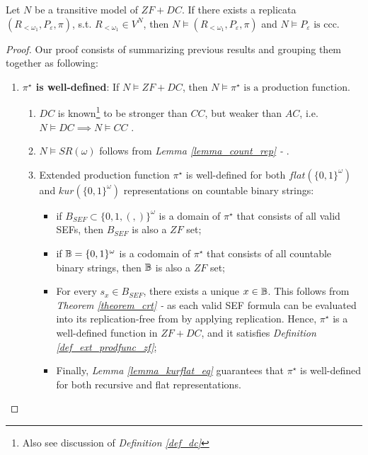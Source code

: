 \begin{lemma}\label{lemma_construct_replicata}
    Let $N$ be a transitive model of $ZF+DC$. If there exists a replicata $(R_{<\omega_1}, P_\varepsilon, \pi)$, s.t. $R_{<\omega_1} \in V^N$, then $N \models (R_{<\omega_1}, P_\varepsilon, \pi)$ and $N \models P_\varepsilon \text{ is ccc}$.
\end{lemma}
\begin{proof}
    Our proof consists of summarizing previous results and grouping them together as following: 
    \begin{enumerate}
        \item \textbf{$\pi^\star$ is well-defined}: If $N \models ZF + DC$, then $N \models \pi^\star \text{ is a production function}$.
        \begin{enumerate}[label=(\roman*)]
            \item $DC$ is known\footnote{Also see discussion of \textit{Definition \ref{def_dc}}} to be stronger than $CC$, but weaker than $AC$, i.e. $N \models DC \implies N \models CC$ \cite{Jech1973AboutTA,herrlich2006ac,asper2020}.
            \item $N \models SR(\omega)$ follows from \textit{Lemma \ref{lemma_count_rep} - }.
            \item Extended production function $\pi^\star$ is well-defined for both $flat(\{0,1\}^\omega)$ and $kur(\{0,1\}^\omega)$ representations on countable binary strings:
            \begin{itemize}
                \item if $B_{SEF} \subset \{0,1,(,)\}^\omega$ is a domain of $\pi^\star$ that consists of all valid SEFs, then $B_{SEF}$ is also a $ZF$ set;
                \item if $\mathbb{B} = \{0,1\}^\omega$ is a codomain of $\pi^\star$ that consists of all countable binary strings, then $\mathbb{B}$ is also a $ZF$ set;
                \item For every $s_x \in B_{SEF}$, there exists a unique $x \in \mathbb{B}$. This follows from \textit{Theorem \ref{theorem_crt} - } as each valid SEF formula can be evaluated into its replication-free from by applying replication. Hence, $\pi^\star$ is a well-defined function in $ZF+DC$, and it satisfies \textit{Definition \ref{def_ext_prodfunc_zf}};
                \item Finally, \textit{Lemma \ref{lemma_kurflat_eq}} guarantees that $\pi^\star$ is well-defined for both recursive and flat representations.

\end{itemize}
\end{enumerate}
\end{enumerate}
\end{proof}
